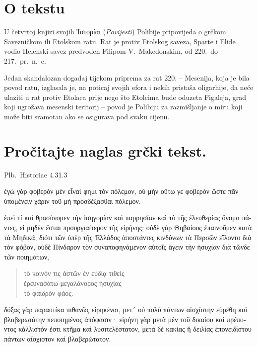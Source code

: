 

\section*{O tekstu}

U četvrtoj knjizi svojih \textgreek[variant=ancient]{Ἱστορίαι} (\textit{Povijesti}) Polibije pripovijeda o grčkom Savezničkom ili Etolskom ratu. Rat je protiv Etolskog saveza, Sparte i Elide vodio Helenski savez predvođen Filipom V.\ Makedonskim, od 220.\ do 217.\ pr.~n.~e.

Jedan skandalozan događaj tijekom priprema za rat 220. – Mesenija, koja je bila povod ratu, izglasala je, na poticaj svojih efora i nekih pristaša oligarhije, da neće ulaziti u rat protiv Etolaca prije nego što Etolcima bude oduzeta Figaleja, grad koji ugrožava mesenski teritorij – povod je Polibiju za razmišljanje o miru koji može biti sramotan ako se osigurava pod svaku cijenu.





\section*{Pročitajte naglas grčki tekst.}

Plb.\ Historiae 4.31.3

\medskip


{\large

\begin{greek}

\noindent ἐγὼ γὰρ φοβερὸν μὲν εἶναί φημι τὸν πόλεμον, οὐ μὴν οὕτω γε φοβερὸν ὥστε πᾶν ὑπομένειν χάριν τοῦ μὴ προσδέξασθαι πόλεμον.

\noindent ἐπεὶ τί καὶ θρασύνομεν τὴν ἰσηγορίαν καὶ παρρησίαν καὶ τὸ τῆς ἐλευθερίας ὄνομα πάντες, εἰ μηδὲν ἔσται προυργιαίτερον τῆς εἰρήνης; οὐδὲ γὰρ Θηβαίους ἐπαινοῦμεν κατὰ τὰ Μηδικά, διότι τῶν ὑπὲρ τῆς Ἑλλάδος ἀποστάντες κινδύνων τὰ Περσῶν εἵλοντο διὰ τὸν φόβον, οὐδὲ Πίνδαρον τὸν συναποφηνάμενον αὐτοῖς ἄγειν τὴν ἡσυχίαν διὰ τῶνδε τῶν ποιημάτων,
\begin{verse}
τὸ κοινόν τις ἀστῶν ἐν εὐδίᾳ τιθεὶς\\
ἐρευνασάτω μεγαλάνορος ἡσυχίας\\
τὸ φαιδρὸν φάος.\\

\end{verse}
δόξας γὰρ παραυτίκα πιθανῶς εἰρηκέναι, μετ´ οὐ πολὺ πάντων αἰσχίστην εὑρέθη καὶ βλαβερωτάτην πεποιημένος ἀπόφασιν· εἰρήνη γὰρ μετὰ μὲν τοῦ δικαίου καὶ πρέποντος κάλλιστόν ἐστι κτῆμα καὶ λυσιτελέστατον, μετὰ δὲ κακίας ἢ δειλίας ἐπονειδίστου πάντων αἴσχιστον καὶ βλαβερώτατον.

\end{greek}

}

